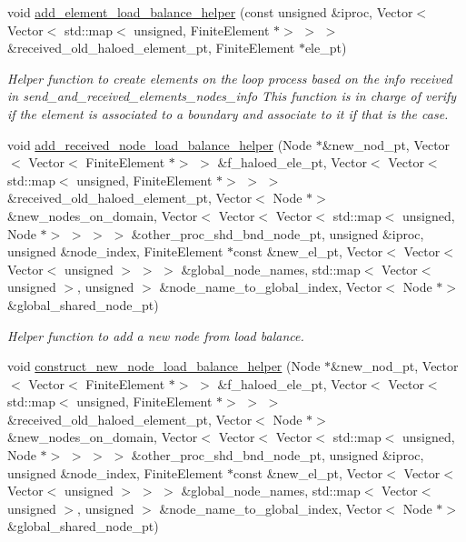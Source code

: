 \begin{DoxyCompactItemize}
void \hyperlink{classoomph_1_1RefineableTriangleMesh_aaab12a2182859c1a8f4ece3752116944}{add\+\_\+element\+\_\+load\+\_\+balance\+\_\+helper} (const unsigned \&iproc, Vector$<$ Vector$<$ std\+::map$<$ unsigned, Finite\+Element $\ast$$>$ $>$ $>$ \&received\+\_\+old\+\_\+haloed\+\_\+element\+\_\+pt, Finite\+Element $\ast$ele\+\_\+pt)
\begin{DoxyCompactList}\small\item\em Helper function to create elements on the loop process based on the info received in send\+\_\+and\+\_\+received\+\_\+elements\+\_\+nodes\+\_\+info This function is in charge of verify if the element is associated to a boundary and associate to it if that is the case. \end{DoxyCompactList}\item 
void \hyperlink{classoomph_1_1RefineableTriangleMesh_a2bdd1a67bb1c83fc9d3c7b1438dc61c4}{add\+\_\+received\+\_\+node\+\_\+load\+\_\+balance\+\_\+helper} (Node $\ast$\&new\+\_\+nod\+\_\+pt, Vector$<$ Vector$<$ Finite\+Element $\ast$$>$ $>$ \&f\+\_\+haloed\+\_\+ele\+\_\+pt, Vector$<$ Vector$<$ std\+::map$<$ unsigned, Finite\+Element $\ast$$>$ $>$ $>$ \&received\+\_\+old\+\_\+haloed\+\_\+element\+\_\+pt, Vector$<$ Node $\ast$$>$ \&new\+\_\+nodes\+\_\+on\+\_\+domain, Vector$<$ Vector$<$ Vector$<$ std\+::map$<$ unsigned, Node $\ast$$>$ $>$ $>$ $>$ \&other\+\_\+proc\+\_\+shd\+\_\+bnd\+\_\+node\+\_\+pt, unsigned \&iproc, unsigned \&node\+\_\+index, Finite\+Element $\ast$const \&new\+\_\+el\+\_\+pt, Vector$<$ Vector$<$ Vector$<$ unsigned $>$ $>$ $>$ \&global\+\_\+node\+\_\+names, std\+::map$<$ Vector$<$ unsigned $>$, unsigned $>$ \&node\+\_\+name\+\_\+to\+\_\+global\+\_\+index, Vector$<$ Node $\ast$$>$ \&global\+\_\+shared\+\_\+node\+\_\+pt)
\begin{DoxyCompactList}\small\item\em Helper function to add a new node from load balance. \end{DoxyCompactList}\item 
void \hyperlink{classoomph_1_1RefineableTriangleMesh_aa772a7cb98786a8296cc1d0b51e40f88}{construct\+\_\+new\+\_\+node\+\_\+load\+\_\+balance\+\_\+helper} (Node $\ast$\&new\+\_\+nod\+\_\+pt, Vector$<$ Vector$<$ Finite\+Element $\ast$$>$ $>$ \&f\+\_\+haloed\+\_\+ele\+\_\+pt, Vector$<$ Vector$<$ std\+::map$<$ unsigned, Finite\+Element $\ast$$>$ $>$ $>$ \&received\+\_\+old\+\_\+haloed\+\_\+element\+\_\+pt, Vector$<$ Node $\ast$$>$ \&new\+\_\+nodes\+\_\+on\+\_\+domain, Vector$<$ Vector$<$ Vector$<$ std\+::map$<$ unsigned, Node $\ast$$>$ $>$ $>$ $>$ \&other\+\_\+proc\+\_\+shd\+\_\+bnd\+\_\+node\+\_\+pt, unsigned \&iproc, unsigned \&node\+\_\+index, Finite\+Element $\ast$const \&new\+\_\+el\+\_\+pt, Vector$<$ Vector$<$ Vector$<$ unsigned $>$ $>$ $>$ \&global\+\_\+node\+\_\+names, std\+::map$<$ Vector$<$ unsigned $>$, unsigned $>$ \&node\+\_\+name\+\_\+to\+\_\+global\+\_\+index, Vector$<$ Node $\ast$$>$ \&global\+\_\+shared\+\_\+node\+\_\+pt)
$$
\end{DoxyCompactItemize}

